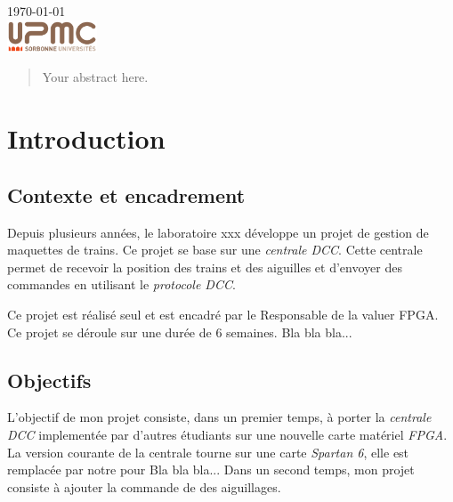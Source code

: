 \begin{titlepage}
{\large \today}\\[2cm] %


\includegraphics[width=0.2\textwidth]{logo.png}


\vfill %

\end{titlepage}



\begin{abstract}
Your abstract here.
\end{abstract}

\section{Introduction}
\label{sec:introduction}

\subsection{Contexte et encadrement}

Depuis plusieurs années, le laboratoire xxx développe un projet de
gestion de maquettes de trains. Ce projet se base sur une
\emph{centrale DCC}. Cette centrale permet de recevoir la position des
trains et des aiguilles et d'envoyer des commandes en utilisant le
\emph{protocole DCC}.

Ce projet est réalisé seul et est encadré par le Responsable de la
valuer FPGA. Ce projet se déroule sur une durée de 6 semaines.
Bla bla bla...

\subsection{Objectifs}

L'objectif de mon projet consiste, dans un premier temps, à porter la
\emph{centrale DCC} implementée par d'autres étudiants sur une nouvelle
carte matériel \emph{FPGA}. La version courante de la centrale tourne sur
une carte \emph{Spartan 6}, elle est remplacée par notre \crt pour Bla
bla bla...
Dans un second temps, mon projet consiste à ajouter la commande de
des aiguillages.

